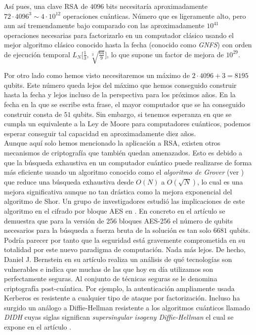 \documentclass[11pt, spanish]{report}
\numberwithin{equation}{section}
\numberwithin{defin}{section}
\begin{document}
Así pues, una clave RSA de $4096$ bits\footnotemark{} necesitaría aproximadamente $72\cdot 4096^3\sim 4\cdot 10^{12}$ operaciones cuánticas. Número que es ligeramente alto, pero aun así tremendamente bajo comparado con las aproximadamente $10^{41}$ operaciones necesarias para factorizarlo en un computador clásico usando el mejor algoritmo clásico conocido hasta la fecha (conocido como \emph{GNFS}) con orden de ejecución temporal $L_N\Big[\frac{1}{3},\sqrt[3]{\frac{64}{9}}\Big]$,  lo que supone un factor de mejora de $10^{29}$.\\


Por otro lado como hemos visto necesitaremos un máximo de $2\cdot 4096+3=8195$ qubits. Este número queda lejos del máximo que hemos conseguido construir hasta la fecha y lejos incluso de la perspectiva para los próximos años. En la fecha en la que se escribe esta frase, el mayor computador que se ha conseguido construir consta de $51$ qubits. Sin embargo, si tenemos esperanza en que se cumpla un equivalente a la Ley de Moore para computadores cuánticos, podemos esperar conseguir tal capacidad en aproximadamente diez años.\\

Aunque aquí solo hemos mencionado la aplicación a RSA, existen otros mecanismos de criptografía que también quedan amenazados. Esto es debido a que la búsqueda exhaustiva en un computador cuántico puede realizarse de forma más eficiente usando un algoritmo conocido como el \emph{algoritmo de Grover} (ver \cite{1996quant.ph..5043G}) que reduce una búsqueda exhaustiva desde $O(N)$ a $O(\sqrt{N})$, lo cual es una mejora significativa aunque no tan drástica como la mejora exponencial del algoritmo de Shor.  Un grupo de investigadores estudió las implicaciones de este algoritmo en el cifrado por bloque AES en \cite{2015arXiv151204965G}. En concreto en el artículo se demuestra que para la versión de 256 bloques AES-256 el número de qubits necesarios para la búsqueda a fuerza bruta de la solución es tan solo $6681$ qubits.\\

Podría parecer por tanto que la seguridad está gravemente comprometida en su totalidad por este nuevo paradigma de computación. Nada más lejos. De hecho, Daniel J. Bernstein en su artículo \cite{bernstein2011post} realiza un análisis de qué tecnologías son vulnerables e indica que muchas de las que hoy en día utilizamos son perfectamente seguras. Al conjunto de técnicas seguras se le denomina criptografía post-cuántica. Por ejemplo, la autenticación ampliamente usada Kerberos es resistente a cualquier tipo de ataque por factorización. Incluso ha surgido un análogo a Diffie-Hellman resistente a los algoritmos cuánticos llamado \textit{DIDH} cuyas siglas significan \emph{supersingular isogeny Diffie-Hellman} el cual se expone en el artículo \cite{jao2011towards}.
\end{document}

